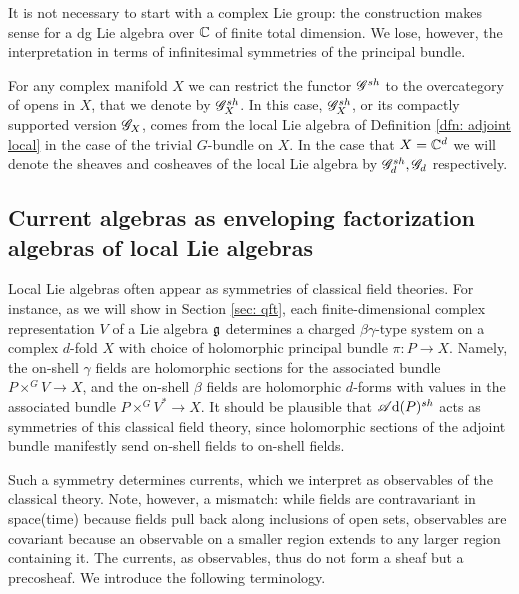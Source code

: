 
\begin{rmk}
It is not necessary to start with a complex Lie group: 
the construction makes sense for a dg Lie algebra over $\mathbb C$ of finite total dimension.
We lose, however, the interpretation in terms of infinitesimal symmetries of the principal bundle.
\end{rmk}

\begin{rmk}
For any complex manifold $X$ we can restrict the functor $\mathscr G^{sh}$ to the overcategory of opens in $X$, that we denote by $\mathscr G^{sh}_X$. 
In this case, $\mathscr G^{sh}_X$, or its compactly supported version $\mathscr G_X$, comes from the local Lie algebra of Definition \ref{dfn: adjoint local} in the case of the trivial $G$-bundle on $X$. 
In the case that $X = \mathbb C^d$ we will denote the sheaves and cosheaves of the local Lie algebra by $\mathscr G_d^{sh}, \mathscr G_d$ respectively.
\end{rmk}

\subsection{Current algebras as enveloping factorization algebras of local Lie algebras}
\label{sec: envelopes}

Local Lie algebras often appear as symmetries of classical field theories.
For instance, as we will show in Section \ref{sec: qft}, 
each finite-dimensional complex representation $V$ of a Lie algebra $\mathfrak g$
determines a charged $\beta\gamma$-type system on a complex $d$-fold $X$ with choice of holomorphic principal bundle $\pi: P \to X$.
Namely, the on-shell $\gamma$ fields are holomorphic sections for the associated bundle $P \times^G V \to X$, 
and the on-shell $\beta$ fields are holomorphic $d$-forms with values in the associated bundle $P \times^G V^* \to X$.
It should be plausible that $\mathscr A{\rm d}(P)^{sh}$ acts as symmetries of this classical field theory,
since holomorphic sections of the adjoint bundle manifestly send on-shell fields to on-shell fields.

Such a symmetry determines currents, which we interpret as observables of the classical theory.
Note, however, a mismatch: 
while fields are contravariant in space(time) because fields pull back along inclusions of open sets, 
observables are covariant because an observable on a smaller region extends to any larger region containing it.
The currents, as observables, thus do not form a sheaf but a precosheaf.
We introduce the following terminology.

